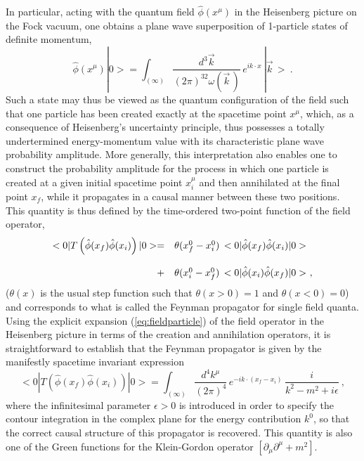 \documentclass[a4paper,11pt]{article}
\begin{document}
In particular, acting with the quantum field $\hat{\phi}(x^\mu)$ in the
Heisenberg picture on the Fock vacuum, one obtains a plane wave superposition
of 1-particle states of definite momentum,
\begin{equation}
\hat{\phi}(x^\mu)|0>=
\int_{(\infty)}\frac{d^3\vec{k}}{(2\pi)^32\omega(\vec{k}\,)}\,
e^{ik\cdot x}\,|\vec{k}\,>\ .
\end{equation}
Such a state may thus be viewed as the quantum configuration of the field
such that one particle has been created exactly at the spacetime point 
$x^\mu$, which, as a consequence of Heisenberg's uncertainty principle,
thus possesses a totally undertermined energy-momentum value with its
characteristic plane wave probability amplitude. More generally,
this interpretation also enables one to construct the probability amplitude
for the process in which one particle is created at a given initial spacetime
point $x^\mu_i$ and then annihilated at the final point $x_f$, while it
propagates in a causal manner between these two positions. This quantity
is thus defined by the time-ordered two-point function of the field
operator,
\begin{equation}
\begin{array}{r l}
<0|T\left(\hat{\phi}(x_f)\hat{\phi}(x_i)\right)|0>=&
\theta(x^0_f-x^0_i)\,<0|\hat{\phi}(x_f)\hat{\phi}(x_i)|0>\\
 & \\
+&\theta(x^0_i-x^0_f)\,<0|\hat{\phi}(x_i)\hat{\phi}(x_f)|0>\ ,
\end{array}
\end{equation}
($\theta(x)$ is the usual step function such that $\theta(x>0)=1$
and $\theta(x<0)=0$) and corresponds to what is called the Feynman propagator 
for single field quanta. Using the explicit expansion (\ref{eq:fieldparticle})
of the field operator in the Heisenberg
picture in terms of the creation and annihilation operators, it is
straightforward to establish that the Feynman propagator is given by the
manifestly spacetime invariant expression
\begin{equation}
<0|T\left(\hat{\phi}(x_f)\hat{\phi}(x_i)\right)|0>=
\int_{(\infty)}\frac{d^4k^\mu}{(2\pi)^4}\,e^{-ik\cdot(x_f-x_i)}\,
\frac{i}{k^2-m^2+i\epsilon}\ ,
\label{eq:Feynmanpropagator}
\end{equation}
where the infinitesimal parameter $\epsilon>0$ is introduced in order
to specify the contour integration in the complex plane for the
energy contribution $k^0$, so that the correct causal structure of this 
propagator is recovered. This quantity is also one of the Green
functions for the Klein-Gordon operator $[\partial_\mu\partial^\mu+m^2]$.
\end{document}
